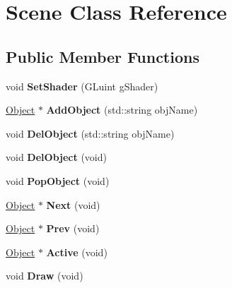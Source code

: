 \hypertarget{class_scene}{\section{Scene Class Reference}
\label{class_scene}
}
\subsection*{Public Member Functions}
\begin{DoxyCompactItemize}
\item 
\hypertarget{class_scene_a3010030e68d0468b8d18c1323e072e80}{void {\bfseries Set\-Shader} (G\-Luint g\-Shader)}\label{class_scene_a3010030e68d0468b8d18c1323e072e80}

\item 
\hypertarget{class_scene_a1183da422d278456867460fb11ac8dc8}{\hyperlink{class_object}{Object} $\ast$ {\bfseries Add\-Object} (std\-::string obj\-Name)}\label{class_scene_a1183da422d278456867460fb11ac8dc8}

\item 
\hypertarget{class_scene_a1643bca3e943c5865c0aecb037006f58}{void {\bfseries Del\-Object} (std\-::string obj\-Name)}\label{class_scene_a1643bca3e943c5865c0aecb037006f58}

\item 
\hypertarget{class_scene_a43fd3c56db5dc940d1724b9573c9a360}{void {\bfseries Del\-Object} (void)}\label{class_scene_a43fd3c56db5dc940d1724b9573c9a360}

\item 
\hypertarget{class_scene_abdfd15e7987aa261840d5ecc265170df}{void {\bfseries Pop\-Object} (void)}\label{class_scene_abdfd15e7987aa261840d5ecc265170df}

\item 
\hypertarget{class_scene_a0a57ee2c15864c55cf3284b937440330}{\hyperlink{class_object}{Object} $\ast$ {\bfseries Next} (void)}\label{class_scene_a0a57ee2c15864c55cf3284b937440330}

\item 
\hypertarget{class_scene_a955c5c984cc6bc5fb532752e43256211}{\hyperlink{class_object}{Object} $\ast$ {\bfseries Prev} (void)}\label{class_scene_a955c5c984cc6bc5fb532752e43256211}

\item 
\hypertarget{class_scene_a50f6c9e9aa2e243da5e86bf3470c809e}{\hyperlink{class_object}{Object} $\ast$ {\bfseries Active} (void)}\label{class_scene_a50f6c9e9aa2e243da5e86bf3470c809e}

\item 
\hypertarget{class_scene_ad5a91c929b569b9111061eec16b3febf}{void {\bfseries Draw} (void)}\label{class_scene_ad5a91c929b569b9111061eec16b3febf}

\end{DoxyCompactItemize}
